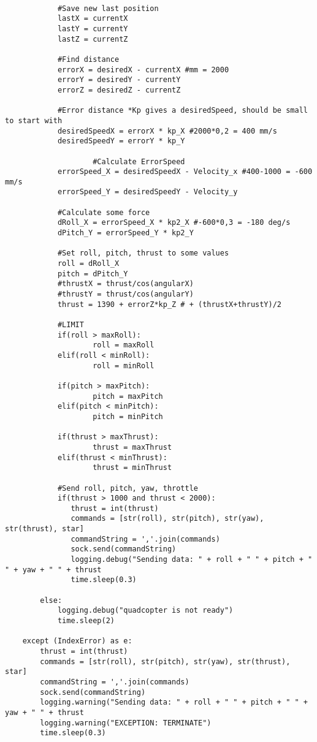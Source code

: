 \begin{lstlisting}
     
            #Save new last position
            lastX = currentX
            lastY = currentY
            lastZ = currentZ
     
            #Find distance
            errorX = desiredX - currentX #mm = 2000
            errorY = desiredY - currentY
            errorZ = desiredZ - currentZ
     
            #Error distance *Kp gives a desiredSpeed, should be small to start with
            desiredSpeedX = errorX * kp_X #2000*0,2 = 400 mm/s
            desiredSpeedY = errorY * kp_Y
     
                    #Calculate ErrorSpeed
            errorSpeed_X = desiredSpeedX - Velocity_x #400-1000 = -600 mm/s
            errorSpeed_Y = desiredSpeedY - Velocity_y
           
            #Calculate some force
            dRoll_X = errorSpeed_X * kp2_X #-600*0,3 = -180 deg/s
            dPitch_Y = errorSpeed_Y * kp2_Y
     
            #Set roll, pitch, thrust to some values
            roll = dRoll_X
            pitch = dPitch_Y
            #thrustX = thrust/cos(angularX)
            #thrustY = thrust/cos(angularY)
            thrust = 1390 + errorZ*kp_Z # + (thrustX+thrustY)/2

            #LIMIT
            if(roll > maxRoll):
                    roll = maxRoll
            elif(roll < minRoll):
                    roll = minRoll

            if(pitch > maxPitch):
                    pitch = maxPitch
            elif(pitch < minPitch):
                    pitch = minPitch

            if(thrust > maxThrust):
                    thrust = maxThrust
            elif(thrust < minThrust):
                    thrust = minThrust 
     
            #Send roll, pitch, yaw, throttle
            if(thrust > 1000 and thrust < 2000):
               thrust = int(thrust)
               commands = [str(roll), str(pitch), str(yaw), str(thrust), star]
               commandString = ','.join(commands)
               sock.send(commandString)
               logging.debug("Sending data: " + roll + " " + pitch + " " + yaw + " " + thrust
               time.sleep(0.3)

        else:
            logging.debug("quadcopter is not ready")
            time.sleep(2)
                
    except (IndexError) as e:
        thrust = int(thrust)
        commands = [str(roll), str(pitch), str(yaw), str(thrust), star] 
        commandString = ','.join(commands)
        sock.send(commandString)
        logging.warning("Sending data: " + roll + " " + pitch + " " + yaw + " " + thrust
        logging.warning("EXCEPTION: TERMINATE")
        time.sleep(0.3)



\end{lstlisting}
